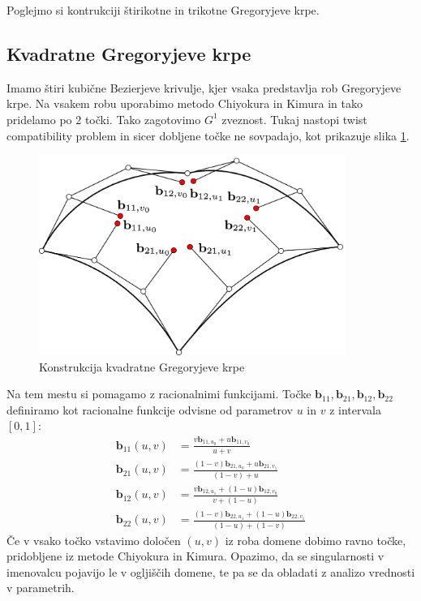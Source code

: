 \documentclass[a4paper,12pt]{article}
\newcommand{\tbf}{\textbf}
\begin{document}
Poglejmo si kontrukciji štirikotne in trikotne Gregoryjeve krpe.


\subsection{Kvadratne Gregoryjeve krpe}
Imamo štiri kubične Bezierjeve krivulje, kjer vsaka predstavlja rob Gregoryjeve krpe. Na vsakem robu uporabimo metodo Chiyokura in Kimura in tako pridelamo po $2$ točki. Tako zagotovimo $G^1$ zveznost. Tukaj nastopi twist compatibility problem in sicer dobljene točke ne sovpadajo, kot prikazuje slika \ref{fig:kvadratna}.

\begin{figure}[h]
	\centering
	\includegraphics[width=10cm]{gregory_krpe_kvadratna.jpg}
	\caption{Konstrukcija kvadratne Gregoryjeve krpe}
	\label{fig:kvadratna}
\end{figure}

Na tem mestu si pomagamo z racionalnimi funkcijami. Točke $\tbf{b}_{11}, \tbf{b}_{21}, \tbf{b}_{12}, \tbf{b}_{22}$ definiramo kot racionalne funkcije odvisne od parametrov $u$ in $v$ z intervala $[0,1]$:
\begin{align*}
\tbf{b}_{11}(u,v) &=  \frac{v \textbf{b}_{11,u_0}+u\tbf{b}_{11,v_0}}{u +v} \\
\tbf{b}_{21}(u,v) &= \frac{(1-v) \tbf{b}_{21,u_0}+u\tbf{b}_{21,v_1}}{(1-v)+u} \\
\tbf{b}_{12}(u,v) &= \frac{v \tbf{b}_{12,u_1}+(1-u)\tbf{b}_{12,v_0}}{v+(1-u)} \\
\tbf{b}_{22}(u,v) &= \frac{(1-v) \tbf{b}_{22,u_1}+(1-u)\tbf{b}_{22,v_1}}{(1-u)+(1-v)} 
\end{align*}
Če v vsako točko vstavimo določen $(u,v)$ iz roba domene dobimo ravno točke, pridobljene iz metode Chiyokura in Kimura. Opazimo, da se singularnosti v imenovalcu pojavijo le v ogljiščih domene, te pa se da obladati z analizo vrednosti v parametrih.
	
\end{document}
